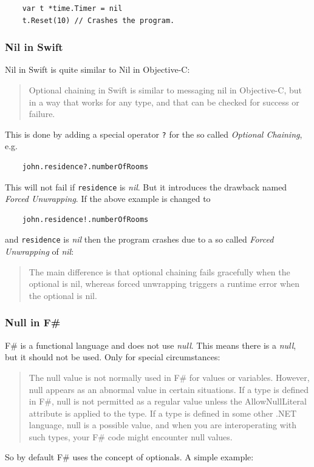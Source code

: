 \documentclass[11pt, a4paper]{report}
\begin{document}
\begin{lstlisting}
    var t *time.Timer = nil
    t.Reset(10) // Crashes the program.
\end{lstlisting}

\subsubsection{Nil in Swift}

Nil in Swift is quite similar to Nil in Objective-C:\@

\begin{quotation}
    Optional chaining in Swift is similar to messaging nil in Objective-C, but in a way that works for any type, and that can be checked for success or failure.\cite{swift-spec-optional-chaining}
\end{quotation}

This is done by adding a special operator \texttt{?} for the so called \textit{Optional Chaining}, e.g.

\begin{lstlisting}
    john.residence?.numberOfRooms
\end{lstlisting}

This will not fail if \texttt{residence} is \textit{nil}. But it introduces the drawback named \textit{Forced Unwrapping}. If the above example is changed to

\begin{lstlisting}
    john.residence!.numberOfRooms
\end{lstlisting}
 and \texttt{residence} is \textit{nil} then the program crashes due to a so called \textit{Forced Unwrapping} of \textit{nil}:

\begin{quotation}
    The main difference is that optional chaining fails gracefully when the optional is nil, whereas forced unwrapping triggers a runtime error when the optional is nil.\cite{swift-spec-optional-chaining}
\end{quotation}

\subsubsection{Null in F\#}

F\# is a functional language and does not use \textit{null}. This means there is a \textit{null}, but it should not be used. Only for special circumstances:

\begin{quotation}
    The null value is not normally used in F\# for values or variables. However, null appears as an abnormal value in certain situations. If a type is defined in F\#, null is not permitted as a regular value unless the AllowNullLiteral attribute is applied to the type. If a type is defined in some other .NET language, null is a possible value, and when you are interoperating with such types, your F\# code might encounter null values.\cite{null-in-fsharp}
\end{quotation}
 So by default F\# uses the concept of optionals\cite{optional-in-fsharp}. A simple example:
\end{document}
